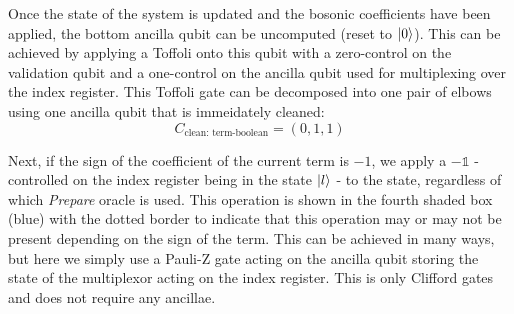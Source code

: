 

Once the state of the system is updated and the bosonic coefficients have been applied, the bottom ancilla qubit can be uncomputed (reset to $\ket{0}$).
This can be achieved by applying a Toffoli onto this qubit with a zero-control on the validation qubit and a one-control on the ancilla qubit used for multiplexing over the index register.
This Toffoli gate can be decomposed into one pair of elbows using one ancilla qubit that is immeidately cleaned:
\begin{equation}
    C_{\text{clean: term-boolean}} = (0, 1, 1)
\end{equation}

Next, if the sign of the coefficient of the current term is $-1$, we apply a $- \mathds{1}$ - controlled on the index register being in the state $\ket{l}$ - to the state, regardless of which \textit{Prepare} oracle is used.
This operation is shown in the fourth shaded box (blue) with the dotted border to indicate that this operation may or may not be present depending on the sign of the term.
This can be achieved in many ways, but here we simply use a Pauli-Z gate acting on the ancilla qubit storing the state of the multiplexor acting on the index register.
This is only Clifford gates and does not require any ancillae.

